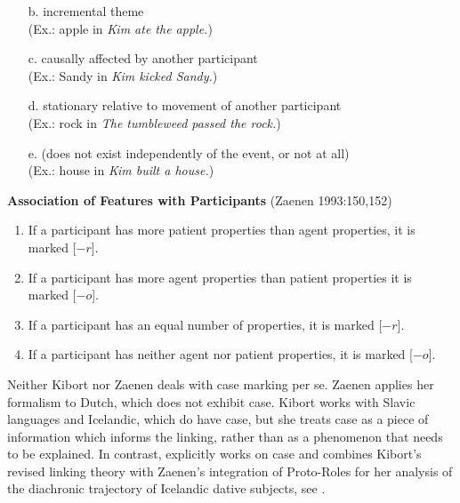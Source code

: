 \documentclass[output=paper,hidelinks]{langscibook}
\begin{document}
\begin{itemize}
 \item[b.] incremental theme \\
(Ex.: apple in {\em Kim ate the apple.}) 

 \item[c.] causally affected by another participant \\
(Ex.: Sandy in {\em Kim kicked Sandy.}) 

 \item[d.] stationary relative to movement of another  participant \\
(Ex.: rock in {\em The tumbleweed passed the rock.}) 

 \item[e.] (does not exist independently of the event, or not at  all)\\
(Ex.: house in {\em Kim built a house.}) 

\end{itemize}
\z




\ea \label{zaenen-maps}
{\bf Association of Features with Participants} (Zaenen 1993:150,152)

\begin{enumerate}

\item If a participant has more patient properties than agent
properties, it is marked [$-r$]. 

\item If a participant has more agent properties than patient
properties it is marked [$-o$]. 

\item If a participant has an equal number of properties,
it is marked [$-r$]. 

\item  If a participant has neither agent nor patient
properties, it is marked [$-o$]. 



\end{enumerate}
\z
Neither Kibort nor Zaenen deals with case marking per se.  Zaenen applies her
formalism to Dutch, which does not exhibit case.  Kibort works with Slavic
languages and Icelandic, which do have case, but she treats case as a piece of
information which informs the linking, rather than as a phenomenon that needs to
be explained.  In contrast, \citet{schaetzle18} explicitly works on case and 
combines Kibort's revised linking theory with Zae\-nen's
integration of Proto-Roles for her analysis of the diachronic trajectory of
Icelandic dative subjects, see .
\end{document}
